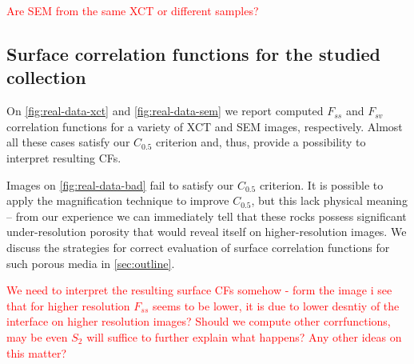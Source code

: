 \documentclass[reprint,amsmath,amssymb,aps,pre,showkeys,showpacs]{revtex4-1}
\begin{document}
\textcolor{red}{Are SEM from the same XCT or different samples?}

\subsection{Surface correlation functions for the studied collection}
On \cref{fig:real-data-xct} and \cref{fig:real-data-sem} we report computed
$F_{ss}$ and $F_{sv}$ correlation functions for a variety of XCT and SEM images,
respectively. Almost all these cases satisfy our $C_{0.5}$ criterion and, thus,
provide a possibility to interpret resulting CFs.

Images on \cref{fig:real-data-bad} fail to satisfy our $C_{0.5}$ criterion. It is
possible to apply the magnification technique to improve $C_{0.5}$, but this
lack physical meaning -- from our experience we can immediately tell that these
rocks possess significant under-resolution porosity that would reveal itself on
higher-resolution images. We discuss the strategies for correct evaluation of
surface correlation functions for such porous media in \cref{sec:outline}.

\textcolor{red}{We need to interpret the resulting surface CFs somehow - form
  the image i see that for higher resolution $F_{ss}$ seems to be lower, it is
  due to lower desntiy of the interface on higher resolution images? Should we
  compute other corrfunctions, may be even $S_2$ will suffice to further explain
  what happens? Any other ideas on this matter?}
\end{document}
